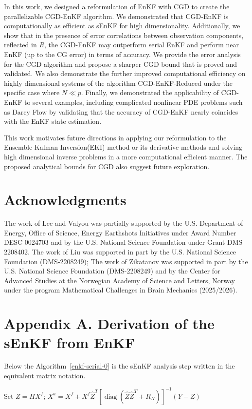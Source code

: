\documentclass[11p]{elsarticle}
\numberwithin{equation}{section}
\begin{document}
In this work, we designed a reformulation of EnKF with CGD to create the parallelizable CGD-EnKF algorithm.  We demonstrated that CGD-EnKF is computationally as efficient as sEnKF for high dimensionality.  Additionally, we show that in the presence of error correlations between observation components, reflected in $R$, the CGD-EnKF may outperform serial EnKF and perform near EnKF (up to the CG error) in terms of accuracy.  We provide the error analysis for the CGD algorithm and propose a sharper CGD bound that is proved and validated.  We also demonstrate the further improved computational efficiency on highly dimensional systems of the algorithm CGD-EnKF-Reduced under the specific case where $N \ll p$. Finally, we demonstrated the applicability of CGD-EnKF to several examples, including complicated nonlinear PDE problems such as Darcy Flow by validating that the accuracy of CGD-EnKF nearly coincides with the EnKF state estimation.

This work motivates future directions in applying our reformulation to the Ensemble Kalman Inversion(EKI) method or its derivative methods and solving high dimensional inverse problems in a more computational efficient manner.  The proposed analytical bounds for CGD also suggest future exploration.

\section*{Acknowledgments}
The work of Lee and Valyou was partially supported by the U.S. Department of Energy, Office of Science, Energy Earthshots Initiatives under Award Number DESC-0024703 and by the U.S. National Science Foundation under Grant DMS-2208402.  The work of Liu was supported in part by the U.S. National Science Foundation (DMS-2208249); The work of Zikatanov was supported in part by the U.S. National Science Foundation (DMS-2208249) and by the Center for Advanced Studies at the Norwegian Academy of Science and Letters, Norway under the program Mathematical Challenges in Brain Mechanics (2025/2026).

\section*{Appendix A. Derivation of the sEnKF from EnKF}
\label{sec:app}

Below the Algorithm~\ref{enkf-serial-0} is the sEnKF analysis step written in the equivalent matrix notation.
 \begin{algorithm}[H]
\caption{Serial EnKF Analysis (Matrix Formulation)\label{enkf-serial-0}}
\begin{algorithmic}[1]
\State     Set \(Z = H X^f\);
\State $X^a= X^f + X^f\widehat{Z}^T
\left[\operatorname{diag}\left(\widehat{Z}\widehat{Z}^T + R_{N}\right)\right]^{-1}
(Y - Z)$
\State {}
\EndFunction
\end{algorithmic}
\end{algorithm}
\end{document}
